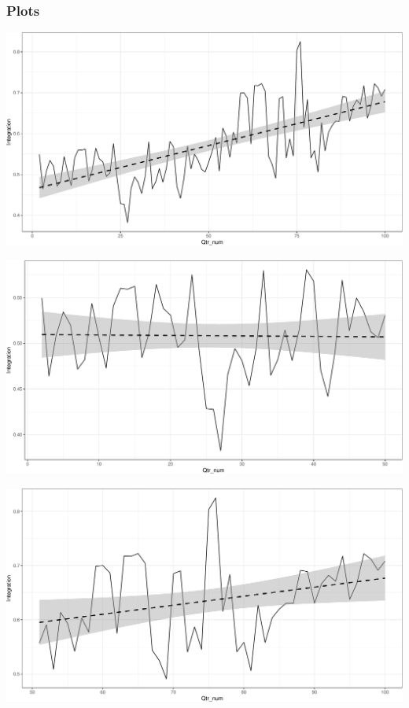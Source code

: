 \documentclass[11pt,]{article}
\begin{document}
\subsubsection{Plots}\label{plots}

\begin{center}\includegraphics{AC_US_Bank_Int_Results_1_files/figure-latex/med_US_bank_int-1} \end{center}

\begin{center}\includegraphics{AC_US_Bank_Int_Results_1_files/figure-latex/med_US_bank_int-2} \end{center}

\begin{center}\includegraphics{AC_US_Bank_Int_Results_1_files/figure-latex/med_US_bank_int-3} \end{center}
\end{document}
